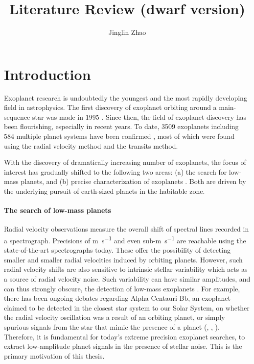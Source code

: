 \documentclass[a4paper]{article}
\title{Literature Review (dwarf version)}
\author{Jinglin Zhao}
\begin{document}
\maketitle



\section{Introduction}

Exoplanet research is undoubtedly the youngest and the most rapidly developing field in astrophysics. The first discovery of exoplanet orbiting around a main-sequence star was made in 1995 \cite{Mayor1995}. Since then, the field of exoplanet discovery has been flourishing, especially in recent years. To date, 3509 exoplanets including 584 multiple planet systems have been confirmed \cite{NASAExoplanetArchive}, most of which were found using the radial velocity method and the transits method. 

With the discovery of dramatically increasing number of exoplanets, the focus of interest has gradually shifted to the following two areas: (a) the search for low-mass planets, and (b) precise characterization of exoplanets \cite{Mayor2014Natur}. Both are driven by the underlying pursuit of earth-sized planets in the habitable zone. 

\paragraph{The search of low-mass planets}
Radial velocity observations measure the overall shift of spectral lines recorded in a spectrograph. 
Precisions of \si{m.s^{-1}} and even sub-\si{m.s^{-1}} are reachable using the state-of-the-art 
spectrographs today. These offer the possibility of detecting smaller and smaller radial velocities induced 
by orbiting planets. However, such radial velocity shifts are also sensitive to intrinsic stellar
variability which acts as a source of radial velocity noise. 
Such variability can have similar amplitudes, and can thus strongly obscure, the detection 
of low-mass exoplanets \cite{Dumusque2016}. For example, there has been ongoing debates regarding Alpha Centauri Bb, an exoplanet claimed to be detected in the closest star system to our Solar System, on whether the radial velocity oscillation was a result of an orbiting planet, or simply spurious signals from the star that mimic the presence of a planet (\cite{Dumusque2012Natur}, \cite{Rajpaul2016}, \cite{Hatzes}). Therefore, it is fundamental for today's extreme precision exoplanet searches, to extract low-amplitude planet signals in the presence of stellar noise. This is the primary motivation of this thesis. 
\end{document}
